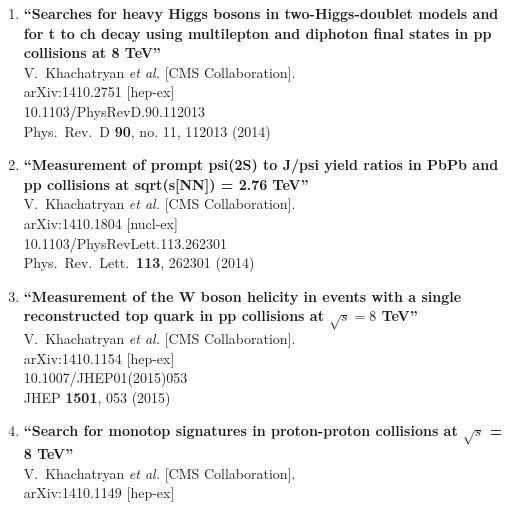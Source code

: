 \documentclass{article}
\begin{document}
\begin{enumerate}


\item%
{\bf ``Searches for heavy Higgs bosons in two-Higgs-doublet models and for t to ch decay using multilepton and diphoton final states in pp collisions at 8 TeV''}
  \\{}V.~Khachatryan {\it et al.}  [CMS Collaboration].
  \\{}arXiv:1410.2751 [hep-ex]
    \\{}10.1103/PhysRevD.90.112013
\\{}Phys.\ Rev.\ D {\bf 90}, no. 11, 112013 (2014) %


\item%
{\bf ``Measurement of prompt psi(2S) to J/psi yield ratios in PbPb and pp collisions at sqrt(s[NN]) = 2.76 TeV''}
  \\{}V.~Khachatryan {\it et al.}  [CMS Collaboration].
  \\{}arXiv:1410.1804 [nucl-ex]
    \\{}10.1103/PhysRevLett.113.262301
\\{}Phys.\ Rev.\ Lett.\  {\bf 113}, 262301 (2014) %


\item%
{\bf ``Measurement of the W boson helicity in events with a single reconstructed top quark in pp collisions at $ \sqrt{s}=8 $ TeV''}
  \\{}V.~Khachatryan {\it et al.}  [CMS Collaboration].
  \\{}arXiv:1410.1154 [hep-ex]
    \\{}10.1007/JHEP01(2015)053
\\{}JHEP {\bf 1501}, 053 (2015) %


\item%
{\bf ``Search for monotop signatures in proton-proton collisions at $\sqrt{s}$ = 8 TeV''}
  \\{}V.~Khachatryan {\it et al.}  [CMS Collaboration].
  \\{}arXiv:1410.1149 [hep-ex]
  

\end{enumerate}
\end{document}
